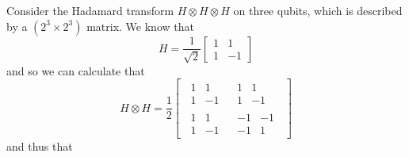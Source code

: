 \documentclass[fleqn,a4paper]{article}
\theoremstyle{definition}
\theoremstyle{definition}
\theoremstyle{definition}
\theoremstyle{definition}
\theoremstyle{remark}
\begin{document}
Consider the Hadamard transform \(H\otimes H\otimes H\) on three qubits, which is described by a \((2^3\times2^3)\) matrix.
We know that
\[
  H = \frac{1}{\sqrt{2}}\begin{bmatrix}1&1\\1&-1\end{bmatrix}
\]
and so we can calculate that
\[
  H\otimes H
  = \frac{1}{2}
  \left[
  \,
    \begin{array}{c|c}
      \begin{matrix}1&1\\1&-1\end{matrix}
      & \begin{matrix}1&1\\1&-1\end{matrix}
    \\\hline
      \begin{matrix}1&1\\1&-1\end{matrix}
      & \begin{matrix}-1&-1\\-1&1\end{matrix}
    \end{array}
  \,
  \right]
\]
and thus that
\end{document}
